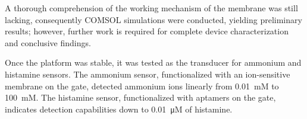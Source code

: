 A thorough comprehension of the working mechanism of the membrane was still
lacking, consequently COMSOL simulations were conducted, yielding preliminary
results; however, further work is required for complete device characterization
and conclusive findings. 

Once the platform was stable, it was tested as the transducer for ammonium and
histamine sensors. The ammonium sensor, functionalized with an ion-sensitive
membrane on the gate, detected ammonium ions linearly from \SI{0.01}{mM} to
\SI{100}{mM}. The histamine sensor, functionalized with aptamers on the gate,
indicates detection capabilities down to \SI{0.01}{\micro M} of histamine.



